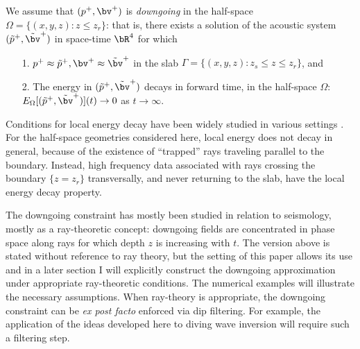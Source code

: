 We assume that $(p^+,\bv^+)$ is {\em downgoing} in the half-space
$\Omega = \{(x,y,z): z \le z_r\}$: that is, there exists a solution of
the acoustic system $(\tilde{p}^+,\tilde{\bv}^+)$ in space-time $\bR^4$
for which
\begin{itemize}
\item[1. ] $p^+ \approx \tilde{p}^+, \bv^+ \approx \tilde{\bv}^+$ in
  the slab $\Gamma = \{(x,y,z): z_s \le z \le z_r\}$, and
\item[2. ] The energy in $(\tilde{p}^+,\tilde{\bv}^+)$ decays in
  forward time, in the half-space $\Omega$:  $E_{\Omega}[(\tilde{p}^+,\tilde{\bv}^+)](t) \rightarrow 0$
  as $t \rightarrow \infty$.
\end{itemize}

Conditions for local energy decay have been widely studied in various
settings \cite[]{MorawetzPhillipsLax:05,Hristova:09}. For the half-space
geometries considered here, local energy does not decay in general,
because of the existence of ``trapped'' rays traveling parallel to the
boundary. Instead, high frequency data associated with rays crossing
the boundary $\{z=z_r\}$ transversally, and never returning to the slab, have
the local energy decay property.

The downgoing constraint has mostly been studied in relation to
seismology, mostly as a ray-theoretic concept: downgoing fields are
concentrated in phase space along rays for which depth $z$ is
increasing with $t$. The version above is stated without reference to
ray theory, but the setting of this paper allows its use and in a
later section I will explicitly construct the downgoing approximation
under appropriate ray-theoretic conditions. The numerical examples will
illustrate the necessary assumptions. When ray-theory is appropriate,
the downgoing constraint can be {\em ex post facto} enforced via dip
filtering. For example, the application of the ideas developed here to
diving wave inversion will require such a filtering step.

